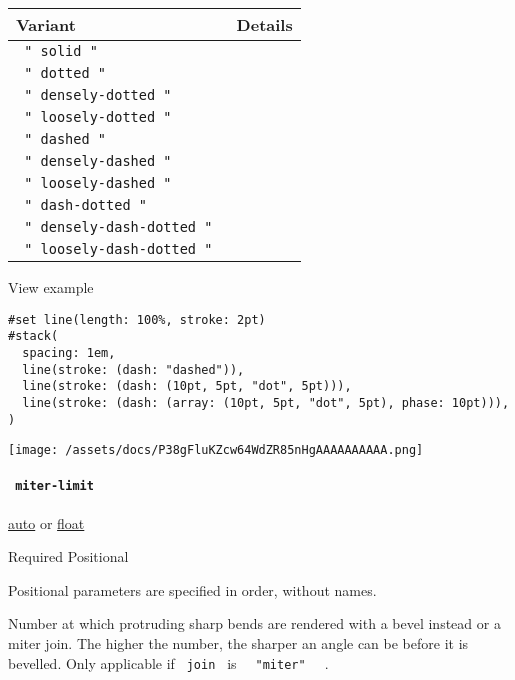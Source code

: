 \begin{longtable}[]{@{}ll@{}}
\toprule\noalign{}
Variant & Details \\
\midrule\noalign{}
\endhead
\bottomrule\noalign{}
\endlastfoot
\texttt{\ "\ solid\ "\ } & \\
\texttt{\ "\ dotted\ "\ } & \\
\texttt{\ "\ densely-dotted\ "\ } & \\
\texttt{\ "\ loosely-dotted\ "\ } & \\
\texttt{\ "\ dashed\ "\ } & \\
\texttt{\ "\ densely-dashed\ "\ } & \\
\texttt{\ "\ loosely-dashed\ "\ } & \\
\texttt{\ "\ dash-dotted\ "\ } & \\
\texttt{\ "\ densely-dash-dotted\ "\ } & \\
\texttt{\ "\ loosely-dash-dotted\ "\ } & \\
\end{longtable}


View example

\begin{verbatim}
#set line(length: 100%, stroke: 2pt)
#stack(
  spacing: 1em,
  line(stroke: (dash: "dashed")),
  line(stroke: (dash: (10pt, 5pt, "dot", 5pt))),
  line(stroke: (dash: (array: (10pt, 5pt, "dot", 5pt), phase: 10pt))),
)
\end{verbatim}

\texttt{[image: /assets/docs/P38gFluKZcw64WdZR85nHgAAAAAAAAAA.png]}

\paragraph{\texorpdfstring{\texttt{\ miter-limit\ }}{ miter-limit }}\label{constructor-miter-limit}

\href{/docs/reference/foundations/auto/}{auto} {or}
\href{/docs/reference/foundations/float/}{float}

{Required} {{ Positional }}

\label{constructor-miter-limit-positional-tooltip}
Positional parameters are specified in order, without names.

Number at which protruding sharp bends are rendered with a bevel instead
or a miter join. The higher the number, the sharper an angle can be
before it is bevelled. Only applicable if \texttt{\ join\ } is
\texttt{\ }{\texttt{\ "miter"\ }}\texttt{\ } .

